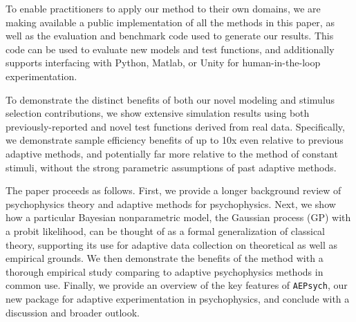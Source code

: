 \documentclass[../main.tex]{subfiles}
\begin{document}
To enable practitioners to apply our method to their own domains, we are making available a public implementation of all the methods in this paper, as well as the evaluation and benchmark code used to generate our results. This code can be used to evaluate new models and test functions, and additionally supports interfacing with Python, Matlab, or Unity for human-in-the-loop experimentation.

To demonstrate the distinct benefits of both our novel modeling and stimulus selection contributions, we show extensive simulation results using both previously-reported and novel test functions derived from real data. Specifically, we demonstrate sample efficiency benefits of up to 10x even relative to previous adaptive methods, and potentially far more relative to the method of constant stimuli, without the strong parametric assumptions of past adaptive methods.

The paper proceeds as follows. First, we provide a longer background review of psychophysics theory and adaptive methods for psychophysics. Next, we show how a particular Bayesian nonparametric model, the Gaussian process (GP) with a probit likelihood, can be thought of as a formal generalization of classical theory, supporting its use for adaptive data collection on theoretical as well as empirical grounds. We then demonstrate the benefits of the method with a thorough empirical study comparing to adaptive psychophysics methods in common use. Finally, we provide an overview of the key features of \texttt{AEPsych}, our new package for adaptive experimentation in psychophysics, and conclude with a discussion and broader outlook.
\end{document}
